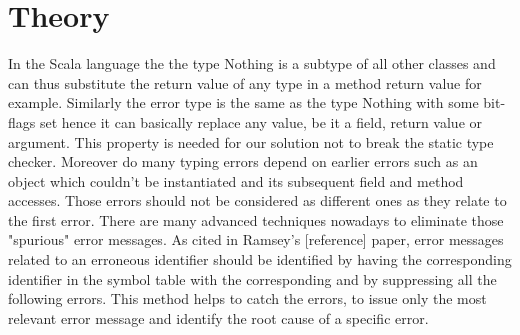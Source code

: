 \section{Theory}

In the Scala language the the type {\ttfamily Nothing} is a subtype of all other classes and can thus substitute the return value of any type in a method return value for example.
Similarly the error type is the same as the type {\ttfamily Nothing} with some bit-flags set hence it can basically replace any value, be it a field, return value or argument. This property is needed for our solution not to break the static type checker.
Moreover do many typing errors depend on earlier errors such as an object which couldn't be instantiated and its subsequent field and method accesses. Those errors should not be considered as different ones as they relate to the first error. There are many advanced techniques nowadays to eliminate those "spurious" error messages. As cited in Ramsey's [reference] paper, error messages related to an erroneous identifier should be identified by having the corresponding identifier in the symbol table with the corresponding and by suppressing all the following errors. This method helps to catch the errors, to issue only the most relevant error message and identify the root cause of a specific error.